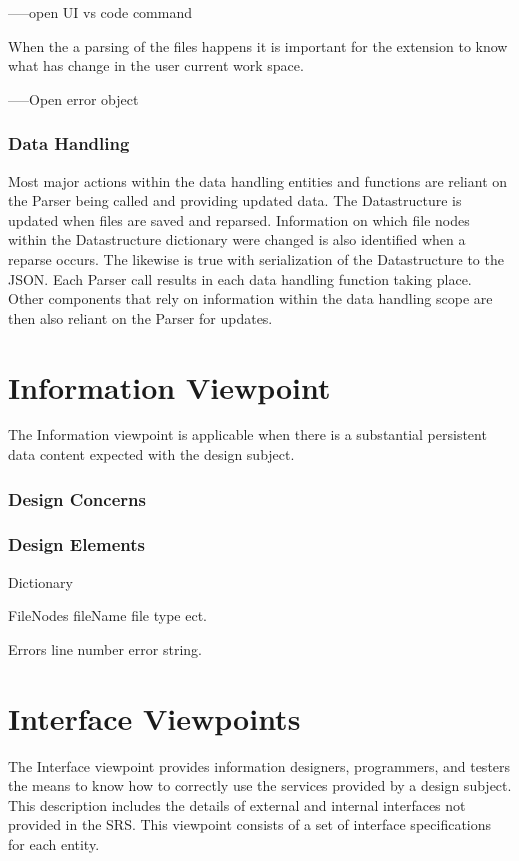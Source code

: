 \documentclass[letterpaper,10pt,titlepage,draftclsnofoot,onecolumn,onesided] {IEEEtran}
\begin{document}
	-----open UI vs code command
	
When the a parsing of the files happens it is important for the extension to know what has change in the user current work space. 
	
	
	-----Open error object

	\subsubsection{Data Handling}
	Most major actions within the data handling entities and functions are reliant on the Parser being called and providing updated data.
	The Datastructure is updated when files are saved and reparsed. 
	Information on which file nodes within the Datastructure dictionary were changed is also identified when a reparse occurs.
	The likewise is true with serialization of the Datastructure to the JSON.
	Each Parser call results in each data handling function taking place. 
	Other components that rely on information within the data handling scope are then also reliant on the Parser for updates.
	
	
\section{Information Viewpoint}
The Information viewpoint is applicable when there is a substantial persistent data content expected with
the design subject. 
\subsubsection{Design Concerns}
\subsubsection{Design Elements}
	Dictionary
	
	FileNodes
		fileName
		file type ect.
		
	Errors
		line number
		error string.

	

		
		
		



\section{Interface Viewpoints}
The Interface viewpoint provides information designers, programmers, and testers the means to know how
to correctly use the services provided by a design subject. This description includes the details of external
and internal interfaces not provided in the SRS. This viewpoint consists of a set of interface specifications
for each entity. 
\end{document}
